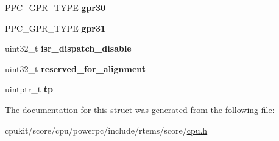 \begin{DoxyCompactItemize}
\mbox{\label{structppc__context_a728ee1a101983a5ca4569f32e06d2912}} 
P\+P\+C\+\_\+\+G\+P\+R\+\_\+\+T\+Y\+PE {\bfseries gpr30}
\item 
\mbox{\label{structppc__context_a0f33b34ce445fdb6fc85dde3cd725f66}} 
P\+P\+C\+\_\+\+G\+P\+R\+\_\+\+T\+Y\+PE {\bfseries gpr31}
\item 
\mbox{\label{structppc__context_a9ab3c2e87b96d9bb587642bf3a0dbb8a}} 
uint32\+\_\+t {\bfseries isr\+\_\+dispatch\+\_\+disable}
\item 
\mbox{\label{structppc__context_adf25d81a77af468129849dba19372fcb}} 
uint32\+\_\+t {\bfseries reserved\+\_\+for\+\_\+alignment}
\item 
\mbox{\label{structppc__context_ab57c76333adcbfb5ddc6b6fab002339c}} 
uintptr\+\_\+t {\bfseries tp}
\end{DoxyCompactItemize}


The documentation for this struct was generated from the following file\+:\begin{DoxyCompactItemize}
\item 
cpukit/score/cpu/powerpc/include/rtems/score/\mbox{\hyperlink{powerpc_2include_2rtems_2score_2cpu_8h}{cpu.\+h}}\end{DoxyCompactItemize}
